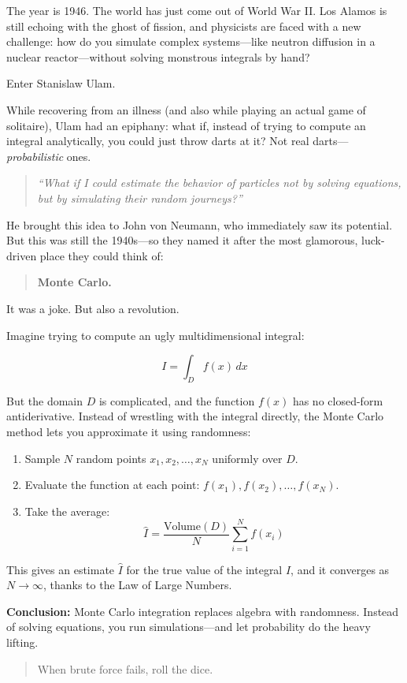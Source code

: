 The year is 1946. The world has just come out of World War II. Los Alamos is still echoing with the ghost of fission, and physicists are faced with a new challenge: how do you simulate complex systems—like neutron diffusion in a nuclear reactor—without solving monstrous integrals by hand?

Enter Stanislaw Ulam.

While recovering from an illness (and also while playing an actual game of solitaire), Ulam had an epiphany: what if, instead of trying to compute an integral analytically, you could just throw darts at it? Not real darts—\textit{probabilistic} ones.

\begin{quote}
\textit{“What if I could estimate the behavior of particles not by solving equations, but by simulating their random journeys?”}
\end{quote}

He brought this idea to John von Neumann, who immediately saw its potential. But this was still the 1940s—so they named it after the most glamorous, luck-driven place they could think of:

\begin{quote}
\textbf{Monte Carlo.}
\end{quote}

It was a joke. But also a revolution.

\begin{example}[title={Monte Carlo: Estimating Integrals by Playing with Chance}]
Imagine trying to compute an ugly multidimensional integral:

\[
I = \int_D f(x)\, dx
\]

But the domain \( D \) is complicated, and the function \( f(x) \) has no closed-form antiderivative. Instead of wrestling with the integral directly, the Monte Carlo method lets you approximate it using randomness:

\begin{enumerate}
  \item Sample \( N \) random points \( x_1, x_2, \ldots, x_N \) uniformly over \( D \).
  \item Evaluate the function at each point: \( f(x_1), f(x_2), \ldots, f(x_N) \).
  \item Take the average:
  \[
  \hat{I} = \frac{\text{Volume}(D)}{N} \sum_{i=1}^N f(x_i)
  \]
\end{enumerate}

This gives an estimate \( \hat{I} \) for the true value of the integral \( I \), and it converges as \( N \to \infty \), thanks to the Law of Large Numbers.

\medskip

\noindent\textbf{Conclusion:} Monte Carlo integration replaces algebra with randomness. Instead of solving equations, you run simulations—and let probability do the heavy lifting.

\begin{quote}
When brute force fails, roll the dice.
\end{quote}
\end{example}


